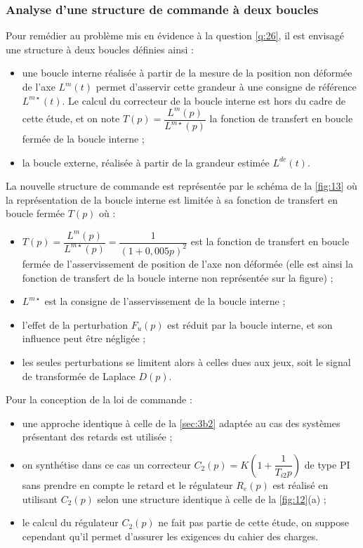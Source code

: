 \subsubsection{Analyse d’une structure de commande à deux boucles}
Pour remédier au problème mis en évidence à la question \ref{q:26}, il est envisagé une structure à deux boucles définies
ainsi :
\begin{itemize}
\item une boucle interne réalisée à partir de la mesure de la position non déformée de l’axe $L^m(t)$ permet d’asservir
cette grandeur à une consigne de référence $L^{m\star}(t)$. Le calcul du correcteur de la boucle interne est hors du
cadre de cette étude, et on note $T(p)=\dfrac{L^{m}(p)}{L^{m\star}(p)}$ la fonction de transfert en boucle fermée de la boucle interne ;
\item la boucle externe, réalisée à partir de la grandeur estimée $L^{de}(t)$.
\end{itemize}
La nouvelle structure de commande est représentée par le schéma de la \autoref{fig:13} où la représentation de la
boucle interne est limitée à sa fonction de transfert en boucle fermée $T(p)$ où :
\begin{itemize}
\item $T(p)=\dfrac{L^{m}(p)}{L^{m\star}(p)}=\dfrac{1}{(1+0,005p)^2}$
est la fonction de transfert en boucle fermée de l’asservissement
de position de l’axe non déformée (elle est ainsi la fonction de transfert de la boucle interne non représentée
sur la figure) ;
\item $L^{m\star}$ est la consigne de l’asservissement de la boucle interne ;
\item l’effet de la perturbation $F_u(p)$ est réduit par la boucle interne, et son influence peut être négligée ;
\item les seules perturbations se limitent alors à celles dues aux jeux, soit le signal de transformée de Laplace $D(p)$.
\end{itemize}
Pour la conception de la loi de commande :
\begin{itemize}
\item une approche identique à celle de la \autoref{sec:3b2} adaptée au cas des systèmes présentant des retards est
utilisée ;
\item on synthétise dans ce cas un correcteur $C_2(p)=K\left(1+\dfrac{1}{T_{i2} p}\right)$ de type PI sans prendre en compte le retard
et le régulateur $R_e(p)$ est réalisé en utilisant $C_2(p)$ selon une structure identique à celle de la \autoref{fig:12}(a) ;
\item le calcul du régulateur $C_2(p)$ ne fait pas partie de cette étude, on suppose cependant qu’il permet d’assurer
les exigences du cahier des charges.
\end{itemize}


